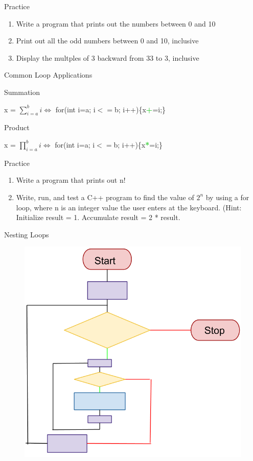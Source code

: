 \documentclass[xcolor={dvipsnames}]{beamer}
\begin{document}
\begin{frame}{Practice}
	\begin{enumerate}
		\item Write a program that prints out the numbers between 0 and 10
		\item Print out all the odd numbers between 0 and 10, inclusive
		\item Display the multples of 3 backward from 33 to 3, inclusive
	\end{enumerate}
\end{frame}

\begin{frame}{Common Loop Applications}
	\begin{block}{Summation}
		\begin{center}
		x = $\displaystyle \sum^{b}_{i=a} i \Leftrightarrow$ for(int i=a; i$<=$b; i++)\{x\textcolor{LimeGreen}{\textbf{+}}=i;\}
		\end{center}
	\end{block}
	\pause
	\begin{block}{Product}
		\begin{center}
		x = $\displaystyle \prod^{b}_{i=a} i \Leftrightarrow$ for(int i=a; i$<=$b; i++)\{x\textcolor{LimeGreen}{\textbf{*}}=i;\}
		\end{center}
	\end{block}
\end{frame}


\begin{frame}{Practice}
	\begin{enumerate}
		\item Write a program that prints out n!
		\item Write, run, and test a C++ program to find the value of $2^{n}$ by using a for loop, where n is an integer value the user enters at the keyboard. (Hint: Initialize result = 1. Accumulate result = 2 * result.
	\end{enumerate}
\end{frame}

\begin{frame}{Nesting Loops}
\begin{figure}
		\includegraphics[width=.75\textwidth]{for_nests}
	\end{figure}
\end{frame}
\end{document}
